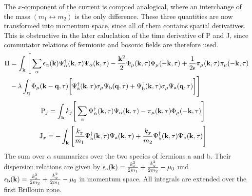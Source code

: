 %
The $x$-component of the current is compted analogical, where an interchange of the mass $(m_1 \leftrightarrow m_2)$ is the only difference. 
These three quantities are now transformed into momentum space, since all of them contains spatial derivatives.
This is obstructive in the later caluclation of the time derivative of P and J, since commutator relations of fermionic and bosonic fields are therefore used.
%
\begin{align}
	\mathrm{H} &= 
	 	\int_{\vb{k}}
	 	\Bigg[ \sum\limits_{\alpha} \epsilon_{\alpha}(\vb{k}) \Psi_{\alpha}^{\dag}(\vb{k},\tau) \Psi_{\alpha}(\vb{k},\tau)
		-
		\frac{\vb{k}^{2}}{2} \Phi_{\mu}(\vb{k},\tau) \Phi_{\mu}(-\vb{k},\tau)
		+
		\frac{1}{2\epsilon} \pi_{\mu}(\vb{k},\tau) \pi_{\mu}(-\vb{k},\tau)
		\notag \\ &
		-
		\lambda \int_{\vb{q}} \Phi_{\mu}(\vb{k}-\vb{q},\tau)
		\bigg[
			\Psi_{\mathrm{a}}^{\dag}(\vb{k},\tau) \sigma_{\mu} \Psi_{\mathrm{b}}(\vb{q},\tau)
			+
			\Psi_{\mathrm{b}}^{\dag}(\vb{k},\tau) \sigma_{\mu} \Psi_{\mathrm{a}}(\vb{q},\tau)
		\bigg]
		\Bigg]
\end{align}
%
%
\begin{align}
	\mathrm{P}_{j} &= \int_{\vb{k}}
		k_{j} \Bigg[ \sum\limits_{\alpha} \Psi_{\alpha}^{\dag}(\vb{k},\tau) \Psi_{\alpha}(\vb{k},\tau)
	 	-
	 	\pi_{\mu}(\vb{k},\tau)
	 	\Phi_{\mu}(-\vb{k},\tau)
	\Bigg]
\end{align}
%
%
\begin{align}
	\mathrm{J}_{x} &= - \int_{\vb{k}} \Bigg[
		\frac{k_{x}}{m_{1}}
		\Psi_{\mathrm{a}}^{\dag}(\vb{k},\tau)
		\Psi_{\mathrm{a}}(\vb{k},\tau)
		+
		\frac{k_{x}}{m_{2}}
		\Psi_{\mathrm{b}}^{\dag}(\vb{k},\tau)
		\Psi_{\mathrm{b}}(\vb{k},\tau)
	\Bigg]
\end{align}
%
The sum over $\alpha$ summarizes over the two species of fermions a and b.
Their dispersion relations are given by $\epsilon_{\mathrm{a}}(\vb{k}) = \frac{k_{x}^{2}}{2m_{1}} + \frac{k_{y}^{2}}{2m_{2}} - \mu_{0}$ und $\epsilon_{\mathrm{b}}(\vb{k}) = \frac{k_{x}^{2}}{2m_{2}} + \frac{k_{y}^{2}}{2m_{1}} - \mu_{0}$ in momentum space.
All integrals are extended over the first Brillouin zone.

